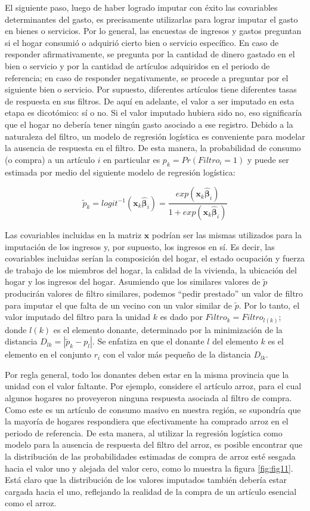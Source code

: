 \documentclass[
  12pt,
]{book}
\begin{document}
El siguiente paso, luego de haber logrado imputar con éxito las covariables determinantes del gasto, es precisamente utilizarlas para lograr imputar el gasto en bienes o servicios. Por lo general, las encuestas de ingresos y gastos preguntan si el hogar consumió o adquirió cierto bien o servicio específico. En caso de responder afirmativamente, se pregunta por la cantidad de dinero gastado en el bien o servicio y por la cantidad de artículos adquiridos en el periodo de referencia; en caso de responder negativamente, se procede a preguntar por el siguiente bien o servicio. Por supuesto, diferentes artículos tiene diferentes tasas de respuesta en sus filtros. De aquí en adelante, el valor a ser imputado en esta etapa es dicotómico: sí o no. Si el valor imputado hubiera sido no, eso significaría que el hogar no debería tener ningún gasto asociado a ese registro. Debido a la naturaleza del filtro, un modelo de regresión logística es conveniente para modelar la ausencia de respuesta en el filtro. De esta manera, la probabilidad de consumo (o compra) a un artículo \(i\) en particular es \(p_k = Pr(Filtro_i = 1)\) y puede ser estimada por medio del siguiente modelo de regresión logística:

\[
\tilde{p}_k = logit^{-1}(\mathbf{x}_k \hat{\boldsymbol{\beta}}_i) =
\frac{exp(\mathbf{x}_k \hat{\boldsymbol{\beta}}_i)}{1+exp(\mathbf{x}_k \hat{\boldsymbol{\beta}}_i)}
\]

Las covariables incluidas en la matriz \(\mathbf{x}\) podrían ser las mismas utilizados para la imputación de los ingresos y, por supuesto, los ingresos en sí. Es decir, las covariables incluidas serían la composición del hogar, el estado ocupación y fuerza de trabajo de los miembros del hogar, la calidad de la vivienda, la ubicación del hogar y los ingresos del hogar. Asumiendo que los similares valores de \(\tilde p\) producirán valores de filtro similares, podemos ``pedir prestado'' un valor de filtro para imputar el que falta de un vecino con un valor similar de \(\tilde p\). Por lo tanto, el valor imputado del filtro para la unidad \(k\) es dado por \(Filtro_k = Filtro_{l(k)}\); donde \(l(k)\) es el elemento donante, determinado por la minimización de la distancia \(D_{lk} = |\tilde p_k - p_l|\). Se enfatiza en que el donante \(l\) del elemento \(k\) es el elemento en el conjunto \(r_i\) con el valor más pequeño de la distancia \(D_{lk}\).

Por regla general, todo los donantes deben estar en la misma provincia que la unidad con el valor faltante. Por ejemplo, considere el artículo arroz, para el cual algunos hogares no proveyeron ninguna respuesta asociada al filtro de compra. Como este es un artículo de consumo masivo en nuestra región, se supondría que la mayoría de hogares respondiera que efectivamente ha comprado arroz en el periodo de referencia. De esta manera, al utilizar la regresión logística como modelo para la ausencia de respuesta del filtro del arroz, es posible encontrar que la distribución de las probabilidades estimadas de compra de arroz esté sesgada hacia el valor uno y alejada del valor cero, como lo muestra la figura \ref{fig:fig11}. Está claro que la distribución de los valores imputados también debería estar cargada hacia el uno, reflejando la realidad de la compra de un artículo esencial como el arroz.
\end{document}
